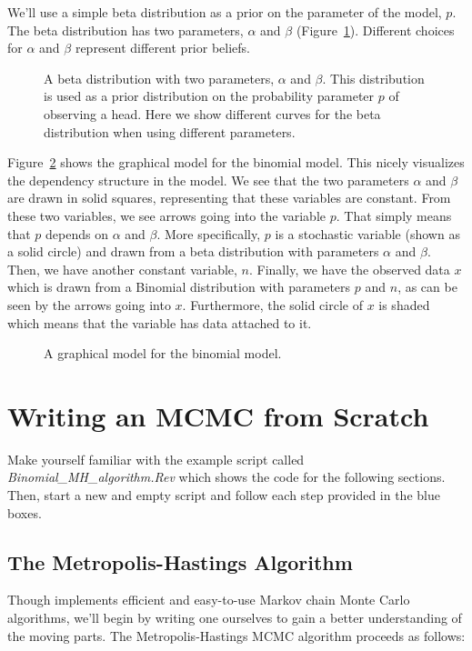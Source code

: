 We'll use a simple beta distribution as a prior on the parameter of the model, $p$.
The beta distribution has two parameters, $\alpha$ and $\beta$ (Figure~\ref{fig:beta_distribution}).
Different choices for $\alpha$ and $\beta$ represent different prior beliefs.
\begin{figure}[h!]
\centering
{}
\label{fig:beta_distribution}
\caption{A beta distribution with two parameters, $\alpha$ and $\beta$. This distribution is used as a prior distribution on the probability parameter $p$ of observing a head. Here we show different curves for the beta distribution when using different parameters.}
\end{figure}


Figure~\ref{fig:binomial_model} shows the graphical model for the binomial model.
This nicely visualizes the dependency structure in the model.
We see that the two parameters $\alpha$ and $\beta$ are drawn in solid squares, representing that these variables are constant.
From these two variables, we see arrows going into the variable $p$.
That simply means that $p$ depends on $\alpha$ and $\beta$.
More specifically, $p$ is a stochastic variable (shown as a solid circle) and drawn from a beta distribution with parameters $\alpha$ and $\beta$.
Then, we have another constant variable, $n$.
Finally, we have the observed data $x$ which is drawn from a Binomial distribution with parameters $p$ and $n$, as can be seen by the arrows going into $x$.
Furthermore, the solid circle of $x$ is shaded which means that the variable has data attached to it.
\begin{figure}[h!]
\centering
{}
\label{fig:binomial_model}
\caption{A graphical model for the binomial model.}
\end{figure}



\section{Writing an MCMC from Scratch}

\impmark Make yourself familiar with the example script called \emph{Binomial\_MH\_algorithm.Rev} which shows the code for the following sections. Then, start a new and empty script and follow each step provided in the \colorbox{shadecolor}{blue boxes}.

\subsection{The Metropolis-Hastings Algorithm}
Though \RevBayes implements efficient and easy-to-use Markov chain Monte Carlo algorithms, we'll begin by writing one ourselves to gain a better understanding of the moving parts.
The Metropolis-Hastings MCMC algorithm \citep{Metropolis1953,Hastings1970} proceeds as follows:

